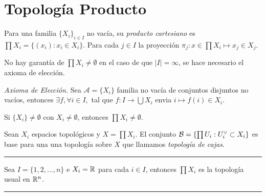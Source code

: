 \section*{Topología Producto}

\begin{definition}
    Para una familia \(\{X_i\}_{i\in I }\) no vacía, su \emph{producto cartesiano} es \(\prod X_i = \{(x_i) : x_{i} \in X_i\} \). Para cada \(j\in I\) la proyección \(\pi_j: x \in \prod X_i \mapsto x_j\in  X_j\).  
\end{definition}
\begin{note}
    No hay garantía de \(\prod X_i \neq \emptyset\) en el caso de que \(|I| = \infty\), se hace necesario el axioma de elección. 
\end{note}
\begin{definition}
    \emph{Axioma de Elección.} Sea \(\mathcal{A}= \{X_i\}\) familia no vacía de conjuntos disjuntos no vacíos, entonces \(\exists f, \forall i\in I,\) tal que \(f:I\to \bigcup X_i \) envia \(i\mapsto f(i) \in X_i\).   
\end{definition}
\begin{proposition}
    Si \(\{X_i\} \neq \emptyset\) con \(X_i\neq \emptyset \), entonces \(\prod X_i \neq \emptyset \).  
\end{proposition}
\begin{proposition}
    Sean \(X_i\) espacios topológicos y \(X = \prod X_i\). El conjunto \(\B = \left\{\prod U_i: U_i^\ab \subset X_i\right\}\) es base para una una topología sobre \(X\) que llamamos \emph{topología de cajas}. 
\end{proposition}

\E

\hrule 
\begin{example}
    Sea \(I=\{1, 2, \ldots, n\}\) e \(X_i = \mathbb{R}\) para cada \(i\in I\), entonces \(\prod X_i\) es la topología usual en \(\mathbb{R}^n\). 
\end{example}
\hrule 

\E

